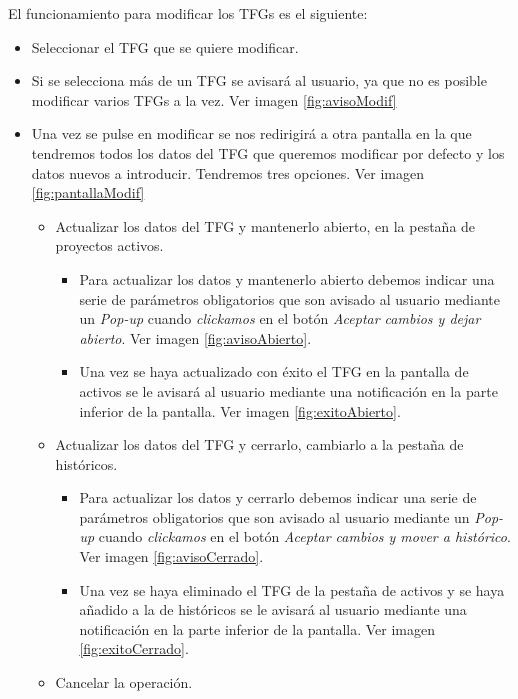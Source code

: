El funcionamiento para modificar los TFGs es el siguiente:
\begin{itemize}
	\item Seleccionar el TFG que se quiere modificar.
	\item Si se selecciona más de un TFG se avisará al usuario, ya que no es posible modificar varios TFGs a la vez. Ver imagen \ref{fig:avisoModif}
	\item Una vez se pulse en modificar se nos redirigirá a otra pantalla en la que tendremos todos los datos del TFG que queremos modificar por defecto y los datos nuevos a introducir. Tendremos tres opciones. Ver imagen \ref{fig:pantallaModif}
	\begin{itemize}
		\item Actualizar los datos del TFG y mantenerlo abierto, en la pestaña de proyectos activos.
		\begin{itemize}
			\item Para actualizar los datos y mantenerlo abierto debemos indicar una serie de parámetros obligatorios que son avisado al usuario mediante un \emph{Pop-up} cuando \emph{clickamos} en el botón \emph{Aceptar cambios y dejar abierto}. Ver imagen \ref{fig:avisoAbierto}.
			\item Una vez se haya actualizado con éxito el TFG en la pantalla de activos se le avisará al usuario mediante una notificación en la parte inferior de la pantalla. Ver imagen \ref{fig:exitoAbierto}.
		\end{itemize}
		\item Actualizar los datos del TFG y cerrarlo, cambiarlo a la pestaña de históricos.
		\begin{itemize}
			\item Para actualizar los datos y cerrarlo debemos indicar una serie de parámetros obligatorios que son avisado al usuario mediante un \emph{Pop-up} cuando \emph{clickamos} en el botón \emph{Aceptar cambios y mover a histórico}. Ver imagen \ref{fig:avisoCerrado}.
			\item Una vez se haya eliminado el TFG de la pestaña de activos y se haya añadido a la de históricos se le avisará al usuario mediante una notificación en la parte inferior de la pantalla. Ver imagen \ref{fig:exitoCerrado}.
		\end{itemize}
		\item Cancelar la operación.
	\end{itemize}
\end{itemize}

